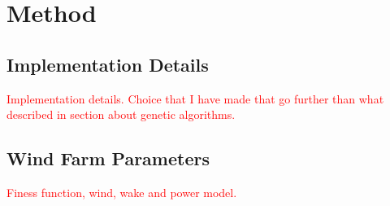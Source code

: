\chapter{Method}\label{section:method}


\section{Implementation Details}
\textcolor{red}{Implementation details. Choice that I have made that go further than what described in section about genetic algorithms.}


\section{Wind Farm Parameters}
\textcolor{red}{Finess function, wind, wake and power model.}